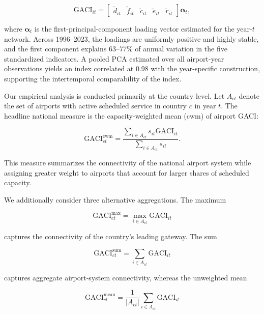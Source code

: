 \documentclass[12pt]{extarticle}
\begin{document}
\begin{equation}
\mathrm{GACI}_{it}
=
\begin{bmatrix}
\tilde d_{it} &
\tilde f_{it} &
\tilde c_{it} &
\tilde e_{it} &
\tilde r_{it}
\end{bmatrix}
\boldsymbol{\alpha}_t ,
\label{eq:nature_17}
\end{equation}

where $\boldsymbol{\alpha}_t$ is the first-principal-component loading vector estimated for the year-$t$ network. Across 1996--2023, the loadings are uniformly positive and highly stable, and the first component explains 63--77\% of annual variation in the five standardized indicators. A pooled PCA estimated over all airport-year observations yields an index correlated at 0.98 with the year-specific construction, supporting the intertemporal comparability of the index.

Our empirical analysis is conducted primarily at the country level. Let $A_{ct}$ denote the set of airports with active scheduled service in country $c$ in year $t$. The headline national measure is the capacity-weighted mean (cwm) of airport GACI:

\begin{equation}
\mathrm{GACI}^{\mathrm{cwm}}_{ct}
=
\frac{
\displaystyle
\sum_{i\in A_{ct}}
s_{it}\mathrm{GACI}_{it}
}{
\displaystyle
\sum_{i\in A_{ct}}
s_{it}
}.
\label{eq:nature_18}
\end{equation}

This measure summarizes the connectivity of the national airport system while assigning greater weight to airports that account for larger shares of scheduled capacity.

We additionally consider three alternative aggregations. The maximum

\begin{equation}
\mathrm{GACI}^{\max}_{ct}
=
\max_{i\in A_{ct}}
\mathrm{GACI}_{it}
\label{eq:nature_19}
\end{equation}

captures the connectivity of the country's leading gateway. The sum

\begin{equation}
\mathrm{GACI}^{\mathrm{sum}}_{ct}
=
\sum_{i\in A_{ct}}
\mathrm{GACI}_{it}
\label{eq:nature_20}
\end{equation}

captures aggregate airport-system connectivity, whereas the unweighted mean

\begin{equation}
\mathrm{GACI}^{\mathrm{mean}}_{ct}
=
\frac{1}{|A_{ct}|}
\sum_{i\in A_{ct}}
\mathrm{GACI}_{it}
\label{eq:nature_21}
\end{equation}
\end{document}
